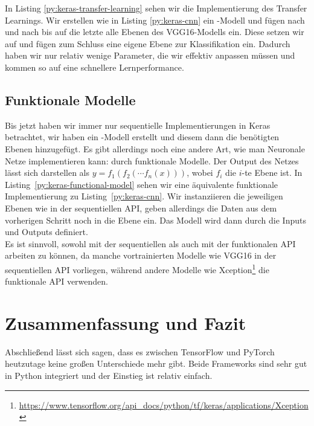 
In Listing \ref{py:keras-transfer-learning} sehen wir die Implementierung des Transfer Learnings. 
Wir erstellen wie in Listing \ref{py:keras-cnn} ein -Modell und fügen nach und nach 
bis auf die letzte alle Ebenen des VGG16-Modells ein. Diese setzen wir auf  
und fügen zum Schluss eine eigene Ebene zur Klassifikation ein. Dadurch haben wir nur relativ wenige Parameter, 
die wir effektiv anpassen müssen und kommen so auf eine schnellere Lernperformance.

\subsection{Funktionale Modelle}
Bis jetzt haben wir immer nur sequentielle Implementierungen in Keras betrachtet, wir haben ein -Modell erstellt und diesem dann 
die benötigten Ebenen hinzugefügt. Es gibt allerdings noch eine andere Art, wie man Neuronale Netze implementieren kann: durch funktionale Modelle.
Der Output des Netzes lässt sich darstellen als \(y = f_1(f_2(\cdots f_n(x)))\), wobei \(f_i\) die \(i\)-te Ebene ist. 
In Listing~\ref{py:keras-functional-model} sehen wir eine äquivalente funktionale Implementierung zu Listing~\ref{py:keras-cnn}. 
Wir instanziieren die jeweiligen Ebenen wie in der sequentiellen API, geben allerdings die Daten aus dem vorherigen Schritt noch in die Ebene ein. 
Das Modell wird dann durch die Inputs und Outputs definiert. \\
Es ist sinnvoll, sowohl mit der sequentiellen als auch mit der funktionalen API arbeiten zu können, da manche vortrainierten Modelle wie VGG16 in der 
sequentiellen API vorliegen, während andere Modelle wie Xception\footnote{\url{https://www.tensorflow.org/api_docs/python/tf/keras/applications/Xception}}
die funktionale API verwenden.

\newpage



\section{Zusammenfassung und Fazit}

Abschließend lässt sich sagen, dass es zwischen TensorFlow und PyTorch heutzutage keine großen Unterschiede mehr gibt. 
Beide Frameworks sind sehr gut in Python integriert und der Einstieg ist relativ einfach.

